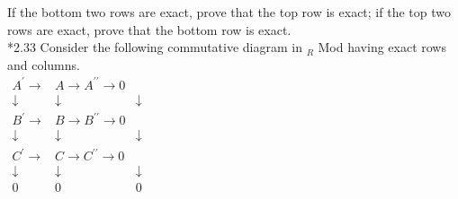 \documentclass[10pt]{article}
\begin{document}
If the bottom two rows are exact, prove that the top row is exact; if the top two rows are exact, prove that the bottom row is exact.\\
*2.33 Consider the following commutative diagram in ${ }_{R}$ Mod having exact rows and columns.\\
$\begin{array}{ccc}A^{\prime} \longrightarrow & A \longrightarrow A^{\prime \prime} \longrightarrow 0 \\ \downarrow & \downarrow & \downarrow \\ B^{\prime} \longrightarrow & B \longrightarrow B^{\prime \prime} \longrightarrow 0 \\ \downarrow & \downarrow & \downarrow \\ C^{\prime} \longrightarrow & C \longrightarrow C^{\prime \prime} \longrightarrow 0 \\ \downarrow & \downarrow & \downarrow \\ 0 & 0 & 0\end{array}$
\end{document}
